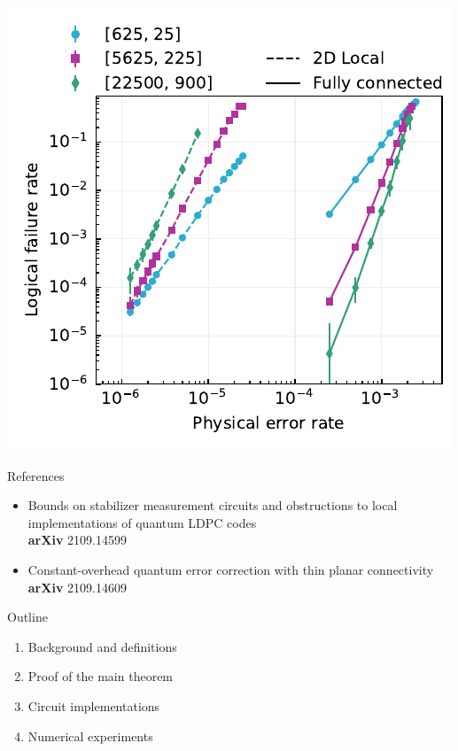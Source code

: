 \begin{frame}
  \centering
  \includegraphics{figs/comparison_alt.pdf}
\end{frame}

\begin{frame}{References}
  \begin{itemize}
    \item 
      Bounds on stabilizer measurement circuits and obstructions to
      local implementations of quantum LDPC codes \\
      {\color{spinsecondary}\textbf{arXiv}} 2109.14599
    \item 
      Constant-overhead quantum error correction with thin planar connectivity \\
      {\color{spinsecondary}\textbf{arXiv}} 2109.14609
  \end{itemize}
\end{frame}

\begin{frame}{Outline}
  \begin{enumerate}
    \item Background and definitions
    \item Proof of the main theorem
    \item Circuit implementations
    \item Numerical experiments
  \end{enumerate}
\end{frame}
